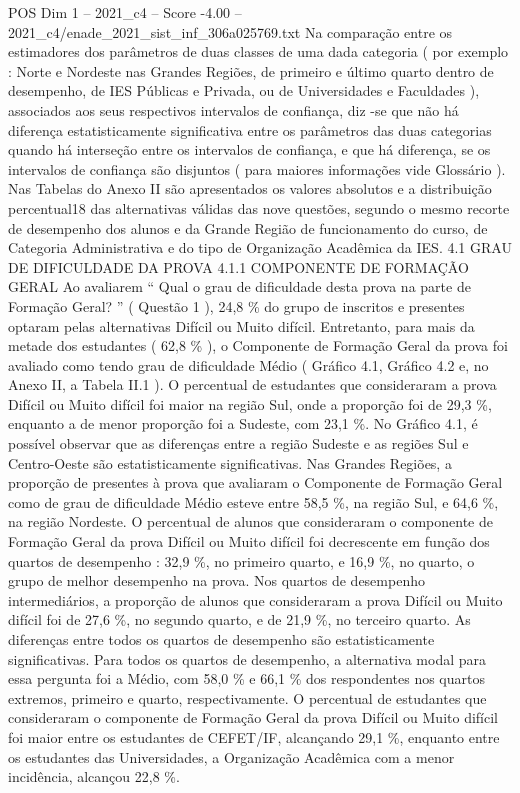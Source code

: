 \begin{textsample}{POS Dim 1 – 2021\_c4 – Score -4.00 – 2021\_c4/enade\_2021\_sist\_inf\_306a025769.txt}
Na comparação entre os estimadores dos parâmetros de duas classes de uma dada categoria ( por exemplo : Norte e Nordeste nas Grandes Regiões, de primeiro e último quarto dentro de desempenho, de IES Públicas e Privada, ou de Universidades e Faculdades ), associados aos seus respectivos intervalos de confiança, diz -se que não há diferença estatisticamente significativa entre os parâmetros das duas categorias quando há interseção entre os intervalos de confiança, e que há diferença, se os intervalos de confiança são disjuntos ( para maiores informações vide Glossário ).
Nas Tabelas do Anexo II são apresentados os valores absolutos e a distribuição percentual18 das alternativas válidas das nove questões, segundo o mesmo recorte de desempenho dos alunos e da Grande Região de funcionamento do curso, de Categoria Administrativa e do tipo de Organização Acadêmica da IES. 4.1 GRAU DE DIFICULDADE DA PROVA 4.1.1 COMPONENTE DE FORMAÇÃO GERAL Ao avaliarem “ Qual o grau de dificuldade desta prova na parte de Formação Geral? ” ( Questão 1 ), 24,8 \% do grupo de inscritos e presentes optaram pelas alternativas Difícil ou Muito difícil.
Entretanto, para mais da metade dos estudantes ( 62,8 \% ), o Componente de Formação Geral da prova foi avaliado como tendo grau de dificuldade Médio ( Gráfico 4.1, Gráfico 4.2 e, no Anexo II, a Tabela II.1 ).
O percentual de estudantes que consideraram a prova Difícil ou Muito difícil foi maior na região Sul, onde a proporção foi de 29,3 \%, enquanto a de menor proporção foi a Sudeste, com 23,1 \%.
No Gráfico 4.1, é possível observar que as diferenças entre a região Sudeste e as regiões Sul e Centro-Oeste são estatisticamente significativas.
Nas Grandes Regiões, a proporção de presentes à prova que avaliaram o Componente de Formação Geral como de grau de dificuldade Médio esteve entre 58,5 \%, na região Sul, e 64,6 \%, na região Nordeste.
O percentual de alunos que consideraram o componente de Formação Geral da prova Difícil ou Muito difícil foi decrescente em função dos quartos de desempenho : 32,9 \%, no primeiro quarto, e 16,9 \%, no quarto, o grupo de melhor desempenho na prova.
Nos quartos de desempenho intermediários, a proporção de alunos que consideraram a prova Difícil ou Muito difícil foi de 27,6 \%, no segundo quarto, e de 21,9 \%, no terceiro quarto.
As diferenças entre todos os quartos de desempenho são estatisticamente significativas.
Para todos os quartos de desempenho, a alternativa modal para essa pergunta foi a Médio, com 58,0 \% e 66,1 \% dos respondentes nos quartos extremos, primeiro e quarto, respectivamente.
O percentual de estudantes que consideraram o componente de Formação Geral da prova Difícil ou Muito difícil foi maior entre os estudantes de CEFET/IF, alcançando 29,1 \%, enquanto entre os estudantes das Universidades, a Organização Acadêmica com a menor incidência, alcançou 22,8 \%.

\end{textsample}
